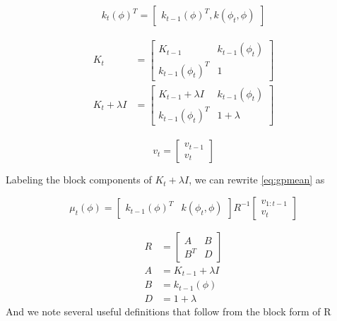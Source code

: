 \documentclass[letterpaper, 10 pt, conference]{ieeeconf}  %
\begin{document}
\begin{equation}
    k_t(\phi)^T=
    \begin{bmatrix}
        k_{t-1}(\phi)^T, k(\phi_t,\phi)
    \end{bmatrix}
\end{equation}

\begin{align}
\begin{split}
    K_t &=
    \begin{bmatrix}
        K_{t-1} & k_{t-1}(\phi_t) \\
        k_{t-1}(\phi_t)^T & 1
    \end{bmatrix}
    \\
    K_t+\lambda I &=
    \begin{bmatrix}
        K_{t-1}+\lambda I & k_{t-1}(\phi_t) \\
        k_{t-1}(\phi_t)^T & 1 + \lambda
    \end{bmatrix}
\end{split}
\end{align}

\begin{equation}
    v_t = 
    \begin{bmatrix}
        v_{t-1} \\
        v_t
    \end{bmatrix}
\end{equation}
\smallskip

Labeling the block components of $K_t+\lambda I$, we can rewrite \eqref{eq:gpmean} as

\begin{equation}
    \mu_t(\phi) =
    \begin{bmatrix}
        k_{t-1}(\phi)^T & k(\phi_t,\phi)
    \end{bmatrix}
    R^{-1}
    \begin{bmatrix}
        v_{1:t-1} \\
        v_t
    \end{bmatrix}
    \label{eq:gpmeanblock}
\end{equation}

\begin{align}
    R&=
    \begin{bmatrix}
        A & B \\
        B^T & D
    \end{bmatrix}
    \nonumber \\
    A &= K_{t-1}+\lambda I \nonumber \\
    B &= k_{t-1}(\phi) \nonumber \\
    D &= 1+\lambda \nonumber
\end{align}
\smallskip
And we note several useful definitions that follow from the block form of R
\end{document}
